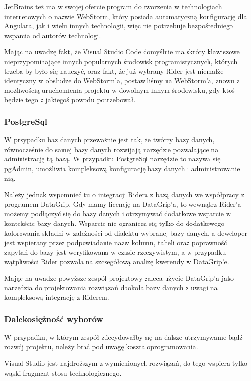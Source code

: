 JetBrains też ma w swojej ofercie program do tworzenia w technologiach internetowych o nazwie WebStorm, który posiada automatyczną konfigurację dla Angulara, jak i wielu innych technologii, więc nie potrzebuje bezpośredniego wsparcia od autorów technologi.


Mając na uwadzę fakt, że Visual Studio Code domyślnie ma skróty klawiszowe nieprzypominające innych popularnych środowisk programistycznych, których trzeba by było się nauczyć, oraz fakt, że już wybrany Rider jest niemalże identyczny w obsłudze do WebStorm'a, postawiliśmy na WebStorm'a, znowu z możliwością uruchomienia projektu w dowolnym innym środowisku, gdy ktoś będzie tego z jakiegoś powodu potrzebował.

\subsubsection{PostgreSql}
W przypadku baz danych przeważnie jest tak, że twórcy bazy danych, równocześnie do samej bazy danych rozwijają narzędzie pozwalające na administrację tą bazą.
W przypadku PostgreSql narzędzie to nazywa się pgAdmin, umożliwia kompleksową konfigurację bazy danych i administrowanie nią.


Należy jednak wspomnieć tu o integracji Ridera z bazą danych we współpracy z programem DataGrip.
Gdy mamy licencję na DataGrip'a, to wewnątrz Rider'a możemy podłączyć się do bazy danych i otrzymywać dodatkowe wsparcie w kontekście bazy danych.
Wsparcie nie ogranicza się tylko do dodatkowego kolorowania składni w zależności od dialektu wybranej bazy danych, a deweloper jest wspierany przez podpowiadanie nazw kolumn, tabeli oraz poprawność zapytań do bazy jest  weryfikowana w czasie rzeczywistym, a w przypadku wątpliwości Rider pozwala na szczegółową analizę kwerendy w DataGrip'e.


Mając na uwadze powyższe zespół projektowy zaleca użycie DataGrip'a jako narzędzia do projektowania rozwiązań dookoła bazy danych z uwagi na kompleksową integrację z Riderem.

\subsubsection{Dalekosiężność wyborów}
W przypadku, w którym zespół zdecydowałby się na dalsze utrzymywanie bądź rozwój projektu, należy brać pod uwagę koszta oprogramowania.


Visual Studio jest najdroższym z wymienionych rozwiązań, do tego wspiera tylko wąski fragment stosu technologicznego.


